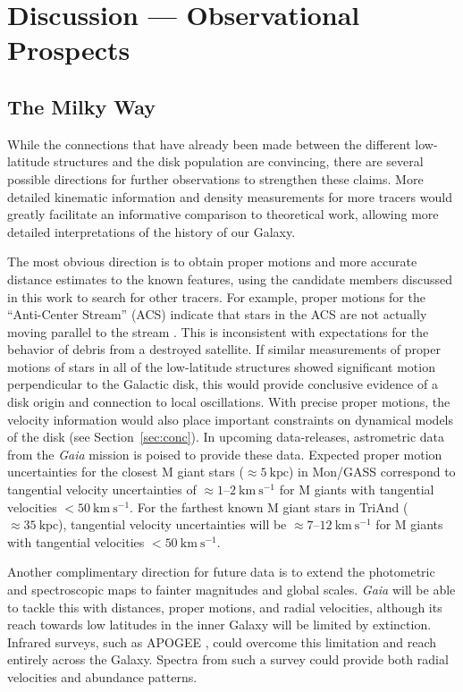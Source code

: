\documentclass[galaxies,article,submit,moreauthors,pdftex,10pt,a4paper]{mdpi}
\newcommand{\kpc}{\mathrm{kpc}}
\newcommand{\kms}{\mathrm{km}~\mathrm{s}^{-1}}
\begin{document}
\section{Discussion --- Observational Prospects}

\subsection{The Milky Way}

While the connections that have already been made between the different
low-latitude structures and the disk population are convincing, there are
several possible directions for further observations to strengthen these claims.
More detailed kinematic information and density measurements for more tracers
would greatly facilitate an informative comparison to theoretical work, allowing
more detailed interpretations of the history of our Galaxy.

The most obvious direction is to obtain proper motions and more accurate
distance estimates to the known features, using the candidate members discussed
in this work to search for other tracers.
For example, proper motions for the ``Anti-Center Stream'' (ACS) \cite[which may
or may not be part of the larger Mon/GASS structure;] []{li12} indicate that
stars in the ACS are not actually moving parallel to the stream \cite{carlin10}.
This is inconsistent with expectations for the behavior of debris from a
destroyed satellite.
If similar measurements of proper motions of stars in all of the low-latitude
structures showed significant motion perpendicular to the Galactic disk, this
would provide conclusive evidence of a disk origin and connection to local
oscillations.
With precise proper motions, the velocity information would also place important
constraints on dynamical models of the disk (see Section~\ref{sec:conc}).
In upcoming data-releases, astrometric data from the {\it Gaia} mission
\cite{gaia} is poised to provide these data.
Expected proper motion uncertainties for the closest M giant stars ($\approx
5~\kpc$) in Mon/GASS correspond to tangential velocity uncertainties of $\approx
1$--$2~\kms$ for M giants with tangential velocities $<50~\kms$.
For the farthest known M giant stars in TriAnd ($\approx 35~\kpc$), tangential
velocity uncertainties will be $\approx 7$--$12~\kms$ for M giants with
tangential velocities $<50~\kms$.

Another complimentary direction for future data is to extend the photometric and spectroscopic maps to fainter magnitudes and global scales.
{\it Gaia} will be able to tackle this with distances, proper motions, and
radial velocities, although its reach towards low latitudes in the inner Galaxy
will be limited by extinction.
Infrared surveys, such as APOGEE \cite{apogee}, could overcome this limitation
and reach entirely across the Galaxy. Spectra from such a survey could provide
both radial velocities and abundance patterns.
\end{document}
